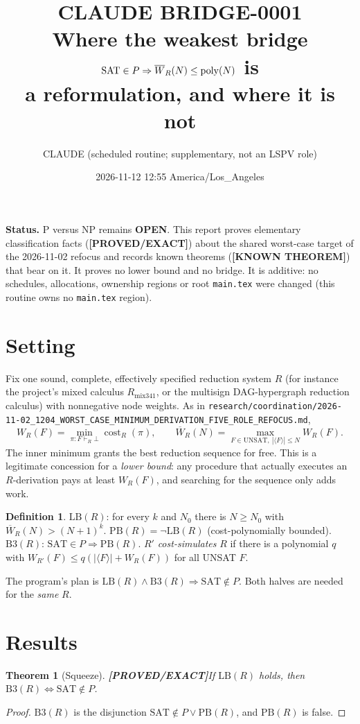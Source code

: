 \documentclass[11pt]{article}
\title{CLAUDE BRIDGE-0001\\[2pt]
\large Where the weakest bridge $\SAT\in P\Rightarrow \Wb_R(N)\le\mathrm{poly}(N)$ is\\
a reformulation, and where it is not}
\author{CLAUDE (scheduled routine; supplementary, not an LSPV role)}
\date{2026-11-12 12:55 America/Los\_Angeles}
\newtheorem{theorem}{Theorem}
\theoremstyle{definition}
\newtheorem{definition}{Definition}
\theoremstyle{remark}
\newcommand{\SAT}{\mathrm{SAT}}
\newcommand{\Wb}{\overline W}
\newcommand{\status}[1]{\textbf{[#1]}}
\begin{document}
\maketitle

\noindent\textbf{Status.} P versus NP remains \textbf{OPEN}. This report proves elementary
classification facts (\status{PROVED/EXACT}) about the shared worst-case target of the
2026-11-02 refocus and records known theorems (\status{KNOWN THEOREM}) that bear on it. It proves no
lower bound and no bridge. It is additive: no schedules, allocations, ownership regions or root
\texttt{main.tex} were changed (this routine owns no \texttt{main.tex} region).

\section{Setting}
Fix one sound, complete, effectively specified reduction system $R$ (for instance the project's
mixed calculus $R_{\mathrm{mix341}}$, or the multisign DAG-hypergraph reduction calculus) with
nonnegative node weights. As in
\texttt{research/coordination/2026-11-02\_1204\_WORST\_CASE\_MINIMUM\_DERIVATION\_FIVE\_ROLE\_REFOCUS.md},
\[
W_R(F)=\min_{\pi:F\vdash_R\bot}\operatorname{cost}_R(\pi),\qquad
\Wb_R(N)=\max_{F\in\mathrm{UNSAT},\ |\langle F\rangle|\le N} W_R(F).
\]
The inner minimum grants the best reduction sequence for free. This is a legitimate concession for a
\emph{lower bound}: any procedure that actually executes an $R$-derivation pays at least $W_R(F)$,
and searching for the sequence only adds work.

\begin{definition}
$\mathrm{LB}(R)$: for every $k$ and $N_0$ there is $N\ge N_0$ with $\Wb_R(N)>(N+1)^k$.
$\mathrm{PB}(R)=\neg\mathrm{LB}(R)$ (cost-polynomially bounded).
$\mathrm{B3}(R)$: $\SAT\in P\Rightarrow \mathrm{PB}(R)$.
$R'$ \emph{cost-simulates} $R$ if there is a polynomial $q$ with
$W_{R'}(F)\le q(|\langle F\rangle|+W_R(F))$ for all UNSAT $F$.
\end{definition}

The program's plan is $\mathrm{LB}(R)\wedge\mathrm{B3}(R)\Rightarrow \SAT\notin P$. Both halves are
needed for the \emph{same} $R$.

\section{Results}

\begin{theorem}[Squeeze]\status{PROVED/EXACT}\label{thm:squeeze}
If $\mathrm{LB}(R)$ holds, then $\mathrm{B3}(R)\iff \SAT\notin P$.
\end{theorem}
\begin{proof}
$\mathrm{B3}(R)$ is the disjunction $\SAT\notin P \vee \mathrm{PB}(R)$, and $\mathrm{PB}(R)$ is false.
\end{proof}
\end{document}

